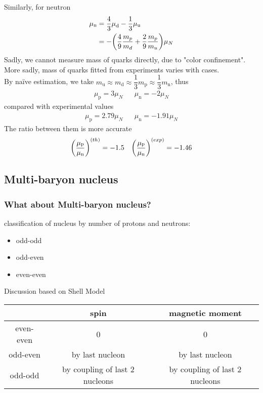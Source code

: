 \documentclass[10pt,aspectratio=43,mathserif]{beamer}
\DeclareMathOperator{\rp}{\mathrm{p}}
\DeclareMathOperator{\rn}{\mathrm{n}}
\DeclareMathOperator{\ru}{\mathrm{u}}
\DeclareMathOperator{\rd}{\mathrm{d}}
\numberwithin{equation}{section}
\begin{document}
\begin{frame}
Similarly, for neutron %
\begin{align}
\mu_{\rn}&= \dfrac{4}{3}\mu_{\rd} - \dfrac{1}{3}\mu_{\ru} \notag\\
&= -\qty(\dfrac{4}{9}\dfrac{m_p}{m_d} + \dfrac{2}{9}\dfrac{m_p}{m_u})\mu_N %
\end{align}
Sadly, we cannot measure mass of quarks directly, due to "color confinement".\\
More sadly, mass of quarks fitted from experiments varies with cases.\\
By na\"ive estimation, we take $ m_{\ru} \approx m_{\rd} \approx \dfrac{1}{3}m_{\rp} \approx \dfrac{1}{3}m_{\rn} $, thus
\begin{align}\label{key}
\mu_{\rp} = 3\mu_N %
&& \mu_{\rn} = -2\mu_N %
\end{align}
compared with experimental values
\begin{align}
\mu_{\rp} = 2.79\mu_N && \mu_{\rn} = -1.91\mu_N
\end{align}
The ratio between them is more accurate
\begin{align}
\qty(\dfrac{\mu_{\rp}}{\mu_{\rn}})^{(th)} = -1.5 && \qty(\dfrac{\mu_{\rp}}{\mu_{\rn}})^{(exp)} = -1.46
\end{align}

\end{frame}

\subsection{Multi-baryon nucleus}
\begin{frame}
\frametitle{What about Multi-baryon nucleus?}
classification of nucleus by number of protons and neutrons:
\begin{itemize}
	\item odd-odd
	\item odd-even
	\item even-even
\end{itemize}
Discussion based on Shell Model\cite{nuc}
\begin{table}
	\centering
	\begin{tabular}{ccc}
		\hline
		& spin & magnetic moment\\ \hline
		even-even & 0 & 0\\
		odd-even & by last nucleon & by last nucleon\\
		odd-odd & by coupling of last 2 nucleons & by coupling of last 2 nucleons\\ 
		\hline
	\end{tabular}
\end{table}

\end{frame}
\end{document}
